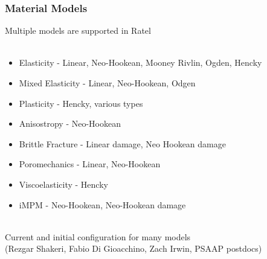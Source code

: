 \documentclass{beamer}
\begin{document}
\begin{frame}
\begin{center}
\frametitle{Material Models}

Multiple models are supported in Ratel\\

~\\

\begin{itemize}

\item Elasticity - Linear, Neo-Hookean, Mooney Rivlin, Ogden, Hencky\\

\item Mixed Elasticity - Linear, Neo-Hookean, Odgen\\

\item Plasticity - Hencky, various types\\

\item Anisostropy - Neo-Hookean\\

\item Brittle Fracture - Linear damage, Neo Hookean damage\\

\item Poromechanics - Linear, Neo-Hookean\\

\item Viscoelasticity - Hencky\\

\item iMPM - Neo-Hookean, Neo-Hookean damage\\

\end{itemize}

~\\

Current and initial configuration for many models\\


(Rezgar Shakeri, Fabio Di Gioacchino, Zach Irwin, PSAAP postdocs)

\end{center}
\end{frame}

\end{document}

